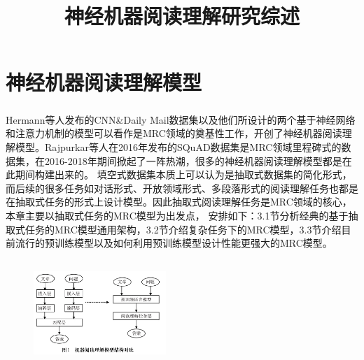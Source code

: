 \documentclass{article}
\title{\heiti \zihao{2} 神经机器阅读理解研究综述}
\date{}
\newcommand{\upcite}[1]{\textsuperscript{\textsuperscript{\cite{#1}}}}
\begin{document}
    \maketitle %

        




																																	



\section{神经机器阅读理解模型}
Hermann等人\upcite{Hermann}发布的CNN\&Daily Mail数据集以及他们所设计的两个基于神经网络和注意力机制的模型可以看作是MRC领域的奠基性工作，开创了神经机器阅读理解模型。Rajpurkar等人\cite{SQuAD1}在2016年发布的SQuAD数据集是MRC领域里程碑式的数据集，在2016-2018年期间掀起了一阵热潮，很多的神经机器阅读理解模型都是在此期间构建出来的。
填空式数据集本质上可以认为是抽取式数据集的简化形式，而后续的很多任务如对话形式、开放领域形式、多段落形式的阅读理解任务也都是在抽取式任务的形式上设计模型。因此抽取式阅读理解任务是MRC领域的核心，本章主要以抽取式任务的MRC模型为出发点，
安排如下：3.1节分析经典的基于抽取式任务的MRC模型通用架构，3.2节介绍复杂任务下的MRC模型，3.3节介绍目前流行的预训练模型以及如何利用预训练模型设计性能更强大的MRC模型。


%

%



%
%
%

\begin{figure}
	\centering
	\includegraphics[width=5cm,height=4cm]{classicTopre}
\end{figure}

\end{document}
